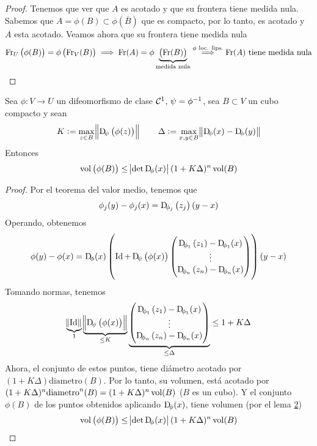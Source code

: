 \begin{proof}
    Tenemos que ver que $A$ es acotado y que su frontera tiene medida nula. Sabemos que $A = \phi(B) \subset \phi\left( \bar{B} \right)$ que es compacto,
    por lo tanto, es acotado y $A$ esta acotado. Veamos ahora que su frontera tiene medida nula
    \[
        \operatorname{Fr}_U\left( \phi(B) \right) = \phi\left( \operatorname{Fr}_V(B) \right) \implies \operatorname{Fr}(A) = \phi\underbrace{\left( \operatorname{Fr}(B) \right)}_{\text{medida nula}}
        \stackrel{\phi \text{ loc. lips.}}{\implies} \operatorname{Fr}(A) \text{ tiene medida nula}
    \]
\end{proof}

\begin{lema*}[6]\label{lema:seis_cambio}
    Sea $\phi \colon V \to U$ un difeomorfismo de clase $\mathcal{C}^1$, $\psi = \phi^{-1}$, sea $B \subset V$ un cubo compacto y sean
    \[
        K := \max_{z \in B} \norm{\Dif_{\psi} \left( \phi(z) \right)} \qquad
        \Delta := \max_{x, y \in B} \norm{\Dif_\phi(x) - \Dif_\phi(y)}
    \]
    Entonces
    \[
        \vol\left( \phi(B) \right) \leq \abs{\det \Dif_\phi(x)}(1+K\Delta)^n \vol(B)
    \]
\end{lema*}

\begin{proof}
    Por el teorema del valor medio, tenemos que
    \[
        \phi_j(y) - \phi_j(x) = \Dif_{\phi_j}\left( z_j \right)(y-x)
    \]
    Operando, obtenemos
    \[
        \phi(y) - \phi(x) = \Dif_\phi(x) \left( 
        \Id + \Dif_\psi\left( \phi(x) \right)
        \begin{pmatrix}
            \Dif_{\phi_1}\left( z_1 \right) - \Dif_{\phi_1} (x) \\
            \vdots \\
            \Dif_{\phi_n}\left( z_n \right) - \Dif_{\phi_n}(x)
        \end{pmatrix}
        \right)
        (y-x)
    \]
    Tomando normas, tenemos
    \[
        \underbrace{\norm{\Id}}_{1}
        \underbrace{\norm{\Dif_\psi\left( \phi(x) \right)}}_{\leq K}
        \underbrace{
            \begin{pmatrix}
                \Dif_{\phi_1}\left( z_1 \right) - \Dif_{\phi_1} (x)
                \\ \vdots \\
                \Dif_{\phi_n}\left( z_n \right) - \Dif_{\phi_n} (x)
            \end{pmatrix}
        }_{\leq \Delta} \leq 1 + K\Delta
    \]
    Ahora, el conjunto de estos puntos, tiene diámetro acotado por $(1+K\Delta)\text{diametro}(B)$. Por lo tanto, su volumen,
    está acotado por $(1+K\Delta)^n\text{diametro}^n(B) = (1+K\Delta)^n\operatorname{vol}(B)$ ($B$ es un cubo). Y el conjunto $\phi(B)$ de los puntos
    obtenidos aplicando $\Dif_\phi(x)$, tiene volumen (por el lema \hyperref[lema:dos_cambio]{2})
    \[
        \vol\left( \phi(B) \right) \leq \abs{\det \Dif_\phi(x)} (1+K\Delta)^n \vol(B)
    \]
\end{proof}

